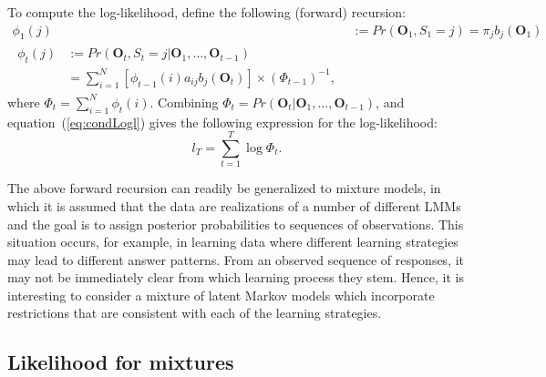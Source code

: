 \documentclass[a4paper,man,nobf]{apa}
\newcommand{\vc}{\mathbf}
\begin{document}
To compute the log-likelihood, \cite{Lys2002} define the following 
(forward) recursion:
\begin{align}
	\phi_{1}(j) &:= Pr(\vc{O}_{1}, S_{1}=j) = \pi_{j} b_{j}(\vc{O}_{1}) 
	\label{eq:fwd1} \\
\begin{split}
	\phi_{t}(j) &:= Pr(\vc{O}_{t}, S_{t}=j|\vc{O}_{1}, \ldots, 
\vc{O}_{t-1}) \\
	&= \sum_{i=1}^{N} [\phi_{t-1}(i)a_{ij}b_{j}(\vc{O}_{t})] \times 
(\Phi_{t-1})^{-1},
	\label{eq:fwdt} 
\end{split} 
\end{align}
where $\Phi_{t}=\sum_{i=1}^{N} \phi_{t}(i)$. Combining 
$\Phi_{t}=Pr(\vc{O}_{t}|\vc{O}_{1}, \ldots, \vc{O}_{t-1})$, and 
equation~(\ref{eq:condLogl}) gives the following expression for the 
log-likelihood:
\begin{equation}
	l_{T} = \sum_{t=1}^{T} \log \Phi_{t}.
\end{equation}

The above forward recursion can readily be generalized to mixture 
models, in which it is assumed that the data are realizations of a 
number of different LMMs and the goal is to assign posterior 
probabilities to sequences of observations. This situation occurs, 
for example, in learning data where different learning strategies may 
lead to different answer patterns. From an observed sequence of 
responses, it may not be immediately clear from which learning 
process they stem. Hence, it is interesting to consider a mixture of 
latent Markov models which incorporate restrictions that are 
consistent with each of the learning strategies. 

\subsection{Likelihood for mixtures}
\end{document}
